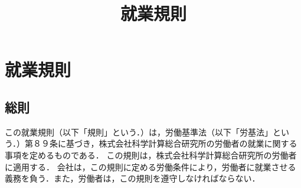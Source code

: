 \documentclass[11pt,a4paper]{jsarticle}
\begin{document}
\title{就業規則}
\date{}
\maketitle
\section{就業規則}
\subsection{総則}
この就業規則（以下「規則」という．）は，労働基準法（以下「労基法」という．）第８９条に基づき，株式会社科学計算総合研究所の労働者の就業に関する事項を定めるものである．
この規則は，株式会社科学計算総合研究所の労働者に適用する．
会社は，この規則に定める労働条件により，労働者に就業させる義務を負う．また，労働者は，この規則を遵守しなければならない．
\end{document}
